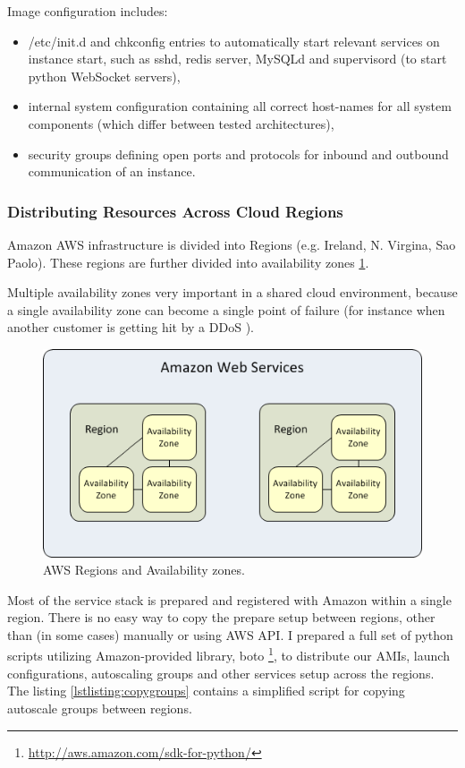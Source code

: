 \documentclass{uvamscse}
\begin{document}
Image configuration includes:
\begin{itemize}
  \item /etc/init.d and chkconfig entries to automatically start relevant services on instance start, such as sshd, redis server, MySQLd and supervisord (to start python WebSocket servers),
  \item internal system configuration containing all correct host-names for all system components (which differ between tested architectures),
  \item security groups defining open ports and protocols for inbound and outbound communication of an instance.
\end{itemize}

\subsubsection{Distributing Resources Across Cloud Regions}

Amazon AWS infrastructure is divided into Regions (e.g. Ireland, N. Virgina, Sao Paolo). These regions are further divided into availability zones \ref{figure:awsregions}.


Multiple availability zones very important in a shared cloud environment, because a single availability zone can become a single point of failure (for instance when another customer is getting hit by a DDoS \cite{GroBuy}).


\begin{figure}[H]
\centering
\includegraphics[scale=0.8]{awsregions}
\caption{AWS Regions and Availability zones.}
\label{figure:awsregions}
\end{figure}

Most of the service stack is prepared and registered with Amazon within a single region. There is no easy way to copy the prepare setup between regions, other than (in some cases) manually or using AWS API. I prepared a full set of python scripts utilizing Amazon-provided library, boto \footnote{\url{http://aws.amazon.com/sdk-for-python/}}, to distribute our AMIs, launch configurations, autoscaling groups and other services setup across the regions. The listing \ref{lstlisting:copygroups} contains a simplified script for copying autoscale groups between regions.
\end{document}
